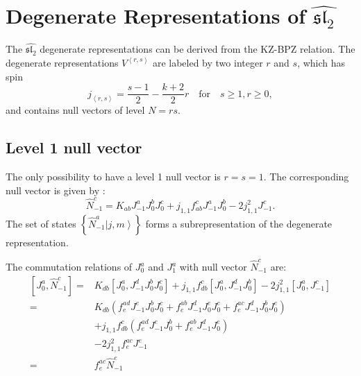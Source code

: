 \documentclass[10pt,a4paper]{article}
\numberwithin{equation}{section}
\newcommand{\ket}[1]{\left| #1 \right\rangle}
\newcommand{\vev}[1]{\left\langle #1 \right\rangle}
\begin{document}
\section{Degenerate Representations of \texorpdfstring{$\widehat{\mathfrak{sl}_{2}}$}{Lg}}
The $\widehat{\mathfrak{sl}_{2}}$ degenerate representations can be derived from the KZ-BPZ relation. The degenerate representations $V^{\vev{r,s}}$
 are labeled by two integer $r$ and $s$, which has spin
\begin{equation}
    j_{\vev{r,s}} = \frac{s-1}{2} - \frac{k+2}{2} r \quad \mathrm{for} \quad s\geq 1, r \geq 0,
\end{equation}
and contains null vectors of level $N=rs$.
\subsection{Level 1 null vector}
The only possibility to have a level 1 null vector is $r = s = 1$. The corresponding null vector is given by \cite{stocco2022torusonepointblock2d}:
\begin{equation}
    \hat{N}^{c}_{-1} = K_{ab} J^{a}_{-1} J^{b}_{0} J^{c}_{0} + j_{1,1} f^{c}_{ab} J^{a}_{-1} J^{b}_{0} - 2 j^{2}_{1,1} J^{c}_{-1}. \label{NV}
\end{equation}
The set of states $\left\{ \hat{N}^{a}_{-1} \ket{j,m} \right\}$ forms a subrepresentation of the degenerate representation.\\
\par The commutation relations of $J^{a}_{0}$ and $J^{a}_{1}$ with null vector $\hat{N}^{c}_{-1}$ are:
\begin{equation}
    \begin{aligned}
        \left[ J^{a}_{0}, \hat{N}^{c}_{-1} \right] 
        =& K_{db} \left[J^{a}_{0}, J^{d}_{-1}J^{b}_{0}J^{c}_{0} \right] + 
            j_{1,1}f^{c}_{db}\left[J^{a}_{0},J^{d}_{-1}J^{b}_{0}\right] - 2 j^{2}_{1,1} \left[J^{a}_{0},J^{c}_{-1}\right]\\
        =& K_{db} \left(f^{ad}_{e}J^{e}_{-1}J^{b}_{0}J^{c}_{0} + f^{ab}_{e}J^{d}_{-1}J^{e}_{0}J^{c}_{0} + f^{ac}_{e}J^{d}_{-1}J^{b}_{0}J^{e}_{0}\right)\\
            &+ j_{1,1}f^{c}_{db} \left( f^{ad}_{e} J^{e}_{-1}J^{b}_{0} + f^{ab}_{e} J^{d}_{-1} J^{e}_{0} \right)\\
            &-2 j^{2}_{1,1} f^{ac}_{e} J^{e}_{-1}\\
        =& f^{ac}_{e} \hat{N}^{e}_{-1}
    \end{aligned}
\end{equation}
\end{document}
